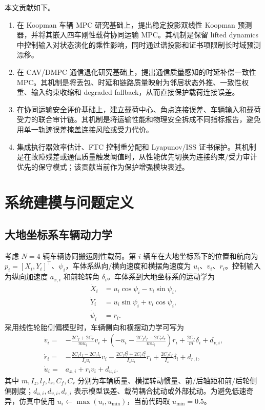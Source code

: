 \documentclass[twocolumn,3p,times,procedia]{elsarticle}
\begin{document}
本文贡献如下。

\begin{enumerate}
\item 在 Koopman 车辆 MPC 研究基础上，提出稳定投影双线性 Koopman 预测器，并将其嵌入四车刚性载荷协同运输 MPC。其机制是保留 lifted dynamics 中控制输入对状态演化的乘性影响，同时通过谱投影和证书项限制长时域预测漂移。
\item 在 CAV/DMPC 通信退化研究基础上，提出通信质量感知的时延补偿一致性 MPC。其机制是将丢包、时延和链路质量映射为邻居状态外推、一致性权重、输入约束收缩和 degraded fallback，从而直接保护载荷连接误差。
\item 在协同运输安全评价基础上，建立载荷中心、角点连接误差、车辆输入和载荷受力的联合审计链。其机制是将运输性能和物理安全拆成不同指标报告，避免用单一轨迹误差掩盖连接风险或受力代价。
\item 集成执行器效率估计、FTC 控制重分配和 Lyapunov/ISS 证书保护。其机制是在故障残差或通信质量触发阈值时，从性能优先切换为连接约束/受力审计优先的保守模式；该贡献当前作为保护增强模块表述。
\end{enumerate}

\section{系统建模与问题定义}

\subsection{大地坐标系车辆动力学}

考虑 $N=4$ 辆车辆协同搬运刚性载荷。第 $i$ 辆车在大地坐标系下的位置和航向为
$p_i=[X_i,Y_i]^\top$、$\psi_i$，车体系纵向/横向速度和横摆角速度为 $u_i$、$v_i$、$r_i$。控制输入为纵向加速度 $a_{x,i}$ 和前轮转角 $\delta_i$。车体系到大地坐标系的运动学为
\begin{equation}
\begin{aligned}
\dot X_i &= u_i\cos\psi_i-v_i\sin\psi_i,\\
\dot Y_i &= u_i\sin\psi_i+v_i\cos\psi_i,\\
\dot \psi_i &= r_i .
\end{aligned}
\label{eq:world_kinematics}
\end{equation}
采用线性轮胎侧偏模型时，车辆侧向和横摆动力学可写为
\begin{equation}
\begin{aligned}
\dot v_i=&-\frac{2C_f+2C_r}{m u_i}v_i+
\left(-u_i-\frac{2C_f l_f-2C_r l_r}{m u_i}\right)r_i
+\frac{2C_f}{m}\delta_i+d_{v,i},\\
\dot r_i=&-\frac{2C_f l_f-2C_r l_r}{I_z u_i}v_i
-\frac{2C_f l_f^2+2C_r l_r^2}{I_z u_i}r_i
+\frac{2C_f l_f}{I_z}\delta_i+d_{r,i},\\
\dot u_i=&a_{x,i}+r_i v_i+d_{u,i}.
\end{aligned}
\label{eq:bicycle_dynamics}
\end{equation}
其中 $m,I_z,l_f,l_r,C_f,C_r$ 分别为车辆质量、横摆转动惯量、前/后轴距和前/后轮侧偏刚度；$d_{u,i},d_{v,i},d_{r,i}$ 表示模型误差、载荷耦合扰动或外部扰动。为避免低速奇异，仿真中使用 $u_i\leftarrow\max(u_i,u_{\min})$，当前代码取 $u_{\min}=0.5$。
\end{document}
